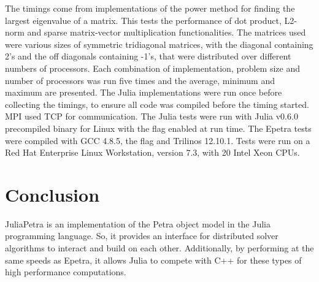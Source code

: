 \documentclass[acmsmall]{acmart}
\newcommand{\snippet}[1]{\texttt{\detokenize{#1}}}
\begin{document}
The timings come from implementations of the power method for finding the largest eigenvalue of a matrix.
\cite{PowerMethod}
This tests the performance of dot product, L2-norm and sparse matrix-vector multiplication functionalities.
The matrices used were various sizes of symmetric tridiagonal matrices, with the diagonal containing 2's
and the off diagonals containing -1's, that were distributed over different numbers of processors.
Each combination of implementation, problem size and number of processors was run five times
and the average, minimum and maximum are presented.
The Julia implementations were run once before collecting the timings, to ensure all code was
compiled before the timing started.
MPI used TCP for communication.
The Julia tests were run with Julia v0.6.0 precompiled binary for Linux
with the \snippet{-O3} flag enabled at run time.
The Epetra tests were compiled with GCC 4.8.5, the \snippet{-O3} flag and Trilinos 12.10.1.
Tests were run on a Red Hat Enterprise Linux Workstation, version 7.3,
with 20 Intel Xeon CPUs.


\section{Conclusion}

JuliaPetra is an implementation of the Petra object model in the Julia programming language.
So, it provides an interface for distributed solver algorithms to interact and build on each other.
Additionally, by performing at the same speeds as Epetra,
it allows Julia to compete with C++ for these types of high performance computations.



\end{document}

